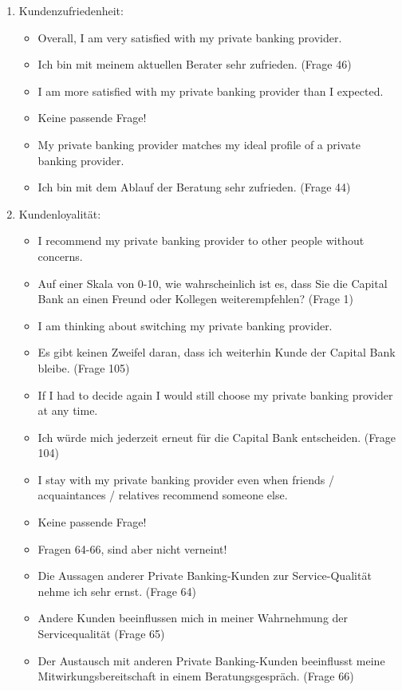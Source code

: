 \documentclass{article}\usepackage[]{graphicx}\usepackage[]{color}
\begin{document}
\begin{enumerate}
    
    \item Kundenzufriedenheit:
    \begin{itemize}
        \item Overall, I am very satisfied with my private banking provider.
        \item Ich bin mit meinem aktuellen Berater sehr zufrieden. (Frage 46)
        \item I am more satisfied with my private banking provider than I expected.
        \item Keine passende Frage!
        \item My private banking provider matches my ideal profile of a private banking provider.
        \item Ich bin mit dem Ablauf der Beratung sehr zufrieden. (Frage 44)
    \end{itemize}

    \item Kundenloyalität:
    \begin{itemize}
        \item I recommend my private banking provider to other people without concerns.
        \item Auf einer Skala von 0-10, wie wahrscheinlich ist es, dass Sie die Capital Bank an einen Freund oder Kollegen weiterempfehlen? (Frage 1)
        \item I am thinking about switching my private banking provider.
        \item Es gibt keinen Zweifel daran, dass ich weiterhin Kunde der Capital Bank bleibe. (Frage 105)
        \item If I had to decide again I would still choose my private banking provider at any time.
        \item Ich würde mich jederzeit erneut für die Capital Bank entscheiden. (Frage 104)
        \item I stay with my private banking provider even when friends / acquaintances / relatives recommend someone else.
        \item Keine passende Frage! 
        \item Fragen 64-66, sind aber nicht verneint!
        \item Die Aussagen anderer Private Banking-Kunden zur Service-Qualität nehme ich sehr ernst. (Frage 64)
        \item Andere Kunden beeinflussen mich in meiner Wahrnehmung der Servicequalität (Frage 65)
        \item Der Austausch mit anderen Private Banking-Kunden beeinflusst meine Mitwirkungsbereitschaft in einem Beratungsgespräch. (Frage 66)    
    \end{itemize}


\end{enumerate}%
\end{document}
